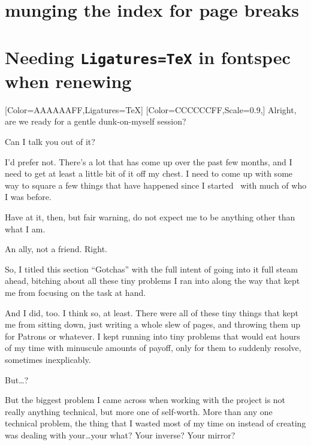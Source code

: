\begin{paracol}{2}
\begin{leftcolumn}
\newpage

\label{indexmunge}\section*{munging the index for page breaks}

\newpage

\label{ligatures}\section*{Needing \texttt{Ligatures=TeX} in fontspec when renewing}
\newpage
\end{leftcolumn}
\begin{rightcolumn}
  [Color=AAAAAAFF,Ligatures=TeX]
  \renewfontfamily{}[Color=CCCCCCFF,Scale=0.9,]
  \noindent Alright, are we ready for a gentle dunk-on-myself session?
  
  \begin{ally}
    Can I talk you out of it?
  \end{ally}
  I'd prefer not. There's a lot that has come up over the past few months, and I need to get at least a little bit of it off my chest. I need to come up with some way to square a few things that have happened since I started \allyWord\ with much of who I was before.

  \begin{ally}
    Have at it, then, but fair warning, do not expect me to be anything other than what I am.
  \end{ally}
  An ally, not a friend. Right.

  So, I titled this section ``Gotchas'' with the full intent of going into it full steam ahead, bitching about all these tiny problems I ran into along the way that kept me from focusing on the task at hand.

  And I did, too. I think so, at least. There were all of these tiny things that kept me from sitting down, just writing a whole slew of pages, and throwing them up for Patrons or whatever. I kept running into tiny problems that would eat hours of my time with minuscule amounts of payoff, only for them to suddenly resolve, sometimes inexplicably.

  \begin{ally}
    But\ldots{}?
  \end{ally}
  But the biggest problem I came across when working with the project is not really anything technical, but more one of self-worth. More than any one technical problem, the thing that I wasted most of my time on instead of creating was dealing with your\ldots{}your what? Your inverse? Your mirror?


\end{rightcolumn}
\end{paracol}
